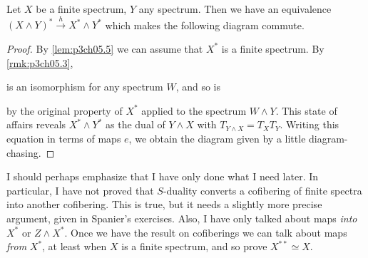 \documentclass[../main]{subfiles}
\begin{document}
\begin{proposition}
Let $X$ be a finite spectrum, $Y$ any spectrum. Then we have an equivalence $(X\wedge Y)^{\ast}\xrightarrow{h}X^{\ast}\wedge Y^{\ast}$ which makes the following diagram commute.
\begin{center}
\end{center}
\end{proposition}
\begin{proof}
By \ref{lem:p3ch05.5} we can assume that $X^{\ast}$ is a finite spectrum. By \ref{rmk:p3ch05.3}, 
\begin{center}
\end{center}
is an isomorphism for any spectrum $W$, and so is
\begin{center}
\end{center}
by the original property of $X^{\ast}$ applied to the spectrum $W\wedge Y$. This state of affairs reveals $X^{\ast}\wedge Y^{\ast}$ as the dual of $Y\wedge X$ with $T_{Y\wedge X}=T_XT_Y$. Writing this equation in terms of maps $e$, we obtain the diagram given by a little diagram-chasing.
\end{proof}

I should perhaps emphasize that I have only done what I need later. In particular, I have not proved that $S$-duality converts a cofibering of finite spectra into another cofibering. This is true, but it needs a slightly more precise argument, given in Spanier's exercises. Also, I have only talked about maps \emph{into} $X^{\ast}$ or $Z\wedge X^{\ast}$. Once we have the result on cofiberings we can talk about maps \emph{from} $X^{\ast}$, at least when $X$ is a finite spectrum, and so prove $X^{\ast\ast}\simeq X$. %
\end{document}
